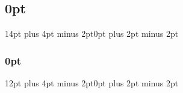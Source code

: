 \documentclass[twoside, a4paper, 11pt]{article}
\begin{document}
\clearpage

\begin{dedication}
    \insertDedication
\end{dedication}

\newpage
\thispagestyle{empty}
\mbox{}

\clearpage



\normalsize
\clearpage



\normalsize
\clearpage

\large
\renewcommand{\abstractname}{Acknowledgments}
\begin{abstract}
    \normalsize
\insertAcknowledgments
\end{abstract}
\normalsize

\clearpage
\renewcommand{\contentsname}{Table of Contents}
{}

\small
\tableofcontents

\clearpage
\renewcommand{\listfigurename}{Figure Catalogue}
{}
\listoffigures

\renewcommand{\listtablename}{Table Catalogue}
{}
\listoftables

\clearpage



\clearpage
{}

\normalsize
\pagestyle{custom_page_style}

\titlespacing\subsection{0pt}{14pt plus 4pt minus 2pt}{0pt plus 2pt minus 2pt}
\titlespacing\subsubsection{0pt}{12pt plus 4pt minus 2pt}{0pt plus 2pt minus 2pt}

\setlength{\parskip}{1em}


\newpage

\newpage

\newpage

\clearpage
\pagestyle{plain}
\printbibliography[heading=bibintoc, title={BIBLIOGRAPHY}]
\clearpage

\appendix
{}

\end{document}
